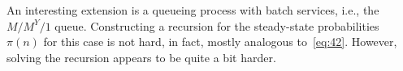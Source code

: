 \begin{extra}
 An interesting extension is a queueing process with batch services, i.e., the $M/M^Y/1$ queue.
 Constructing a recursion for the steady-state probabilities $\pi(n)$ for this case is not hard, in fact, mostly analogous to~\cref{eq:42}.
 However, solving the recursion appears to be quite a bit harder. 
\end{extra}





